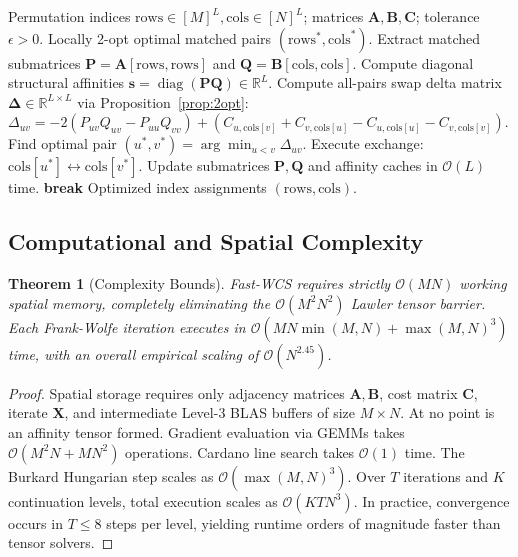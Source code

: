\documentclass[a4paper,fleqn]{cas-dc}
\theoremstyle{thmstyleone}
\newtheorem{theorem}{Theorem}
\theoremstyle{thmstyletwo}
\theoremstyle{thmstylethree}
\begin{document}
\begin{algorithm}[!t]
\caption{Vectorized Level-3 BLAS 2-Opt Local Refinement}
\label{alg:blas3_2opt}
\begin{algorithmic}[1]\small
\REQUIRE Permutation indices $\mathrm{rows} \in [M]^L, \mathrm{cols} \in [N]^L$; matrices $\mathbf{A}, \mathbf{B}, \mathbf{C}$; tolerance $\epsilon > 0$.
\ENSURE Locally 2-opt optimal matched pairs $(\mathrm{rows}^*, \mathrm{cols}^*)$.
\REPEAT
    \STATE Extract matched submatrices $\mathbf{P} = \mathbf{A}[\mathrm{rows}, \mathrm{rows}]$ and $\mathbf{Q} = \mathbf{B}[\mathrm{cols}, \mathrm{cols}]$.
    \STATE Compute diagonal structural affinities $\mathbf{s} = \operatorname{diag}(\mathbf{P}\mathbf{Q}) \in \mathbb{R}^L$.
    \STATE Compute all-pairs swap delta matrix $\mathbf{\Delta} \in \mathbb{R}^{L \times L}$ via Proposition~\ref{prop:2opt}:
    \STATE \quad $\Delta_{uv} = -2(P_{uv} Q_{uv} - P_{uu} Q_{vv}) + (C_{u, \mathrm{cols}[v]} + C_{v, \mathrm{cols}[u]} - C_{u, \mathrm{cols}[u]} - C_{v, \mathrm{cols}[v]})$.
    \STATE Find optimal pair $(u^*, v^*) = \arg\min_{u < v} \Delta_{uv}$.
        \STATE Execute exchange: $\mathrm{cols}[u^*] \leftrightarrow \mathrm{cols}[v^*]$.
        \STATE Update submatrices $\mathbf{P}, \mathbf{Q}$ and affinity caches in $\mathcal{O}(L)$ time.
    \ELSE
        \STATE \textbf{break}
    \ENDIF
{}
\RETURN Optimized index assignments $(\mathrm{rows}, \mathrm{cols})$.
\end{algorithmic}
\end{algorithm}

\subsection{Computational and Spatial Complexity}
\begin{theorem}[Complexity Bounds]
Fast-WCS requires strictly $\mathcal{O}(MN)$ working spatial memory, completely eliminating the $\mathcal{O}(M^2 N^2)$ Lawler tensor barrier. Each Frank-Wolfe iteration executes in $\mathcal{O}(MN\min(M, N) + \max(M, N)^3)$ time, with an overall empirical scaling of $\mathcal{O}(N^{2.45})$.
\end{theorem}
\begin{proof}
Spatial storage requires only adjacency matrices $\mathbf{A}, \mathbf{B}$, cost matrix $\mathbf{C}$, iterate $\mathbf{X}$, and intermediate Level-3 BLAS buffers of size $M \times N$. At no point is an affinity tensor formed. Gradient evaluation via GEMMs takes $\mathcal{O}(M^2 N + M N^2)$ operations. Cardano line search takes $\mathcal{O}(1)$ time. The Burkard Hungarian step scales as $\mathcal{O}(\max(M, N)^3)$. Over $T$ iterations and $K$ continuation levels, total execution scales as $\mathcal{O}(K T N^3)$. In practice, convergence occurs in $T \le 8$ steps per level, yielding runtime orders of magnitude faster than tensor solvers.
\end{proof}
\end{document}
